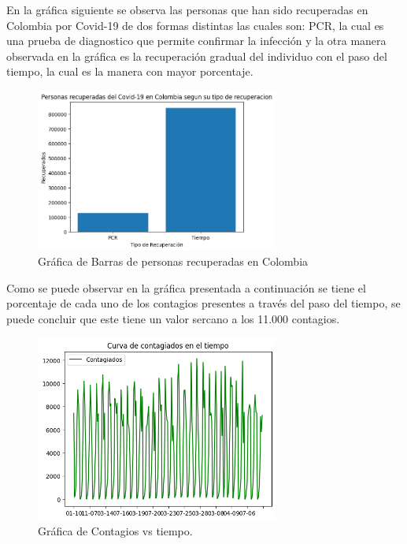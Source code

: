 \documentclass[conference,compsoc,onecolumn]{IEEEtran}
\begin{document}
En la gráfica siguiente se observa las personas que han sido recuperadas en Colombia por Covid-19 de dos formas distintas las cuales son: PCR, la cual es una prueba de diagnostico que permite confirmar la infección y la otra manera observada en la gráfica es la recuperación gradual del individuo con el paso del tiempo, la cual es la manera con mayor porcentaje.
\begin{figure}[H]
\centering
\includegraphics[width=8cm]{./GraficoBarras_Recuperacion1.png}
\caption{Gráfica de Barras de personas recuperadas en Colombia}
\label{fig:mesh1}
\end{figure}

Como se puede observar en la gráfica presentada a continuación se tiene el porcentaje de cada uno de los contagios presentes a través del paso del tiempo, se puede concluir que este tiene un valor sercano a los 11.000 contagios.
\begin{figure}[H]
\centering
\includegraphics[width=8cm]{./Graficocontagios1.png}
\caption{Gráfica de Contagios vs tiempo.}
\label{fig:mesh1}
\end{figure}
\end{document}
